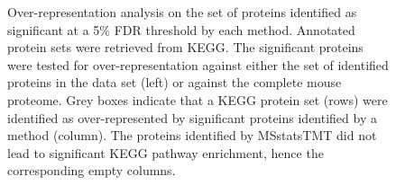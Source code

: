 \documentclass[
  letterpaper,
  DIV=11,
  numbers=noendperiod]{scrartcl}
\begin{document}
\begin{figure}[H]


\caption{\label{fig-ora}Over-representation analysis on the set of
proteins identified as significant at a 5\% FDR threshold by each
method. Annotated protein sets were retrieved from KEGG. The significant
proteins were tested for over-representation against either the set of
identified proteins in the data set (left) or against the complete mouse
proteome. Grey boxes indicate that a KEGG protein set (rows) were
identified as over-represented by significant proteins identified by a
method (column). The proteins identified by MSstatsTMT did not lead to
significant KEGG pathway enrichment, hence the corresponding empty
columns.}

\end{figure}%
\end{document}
